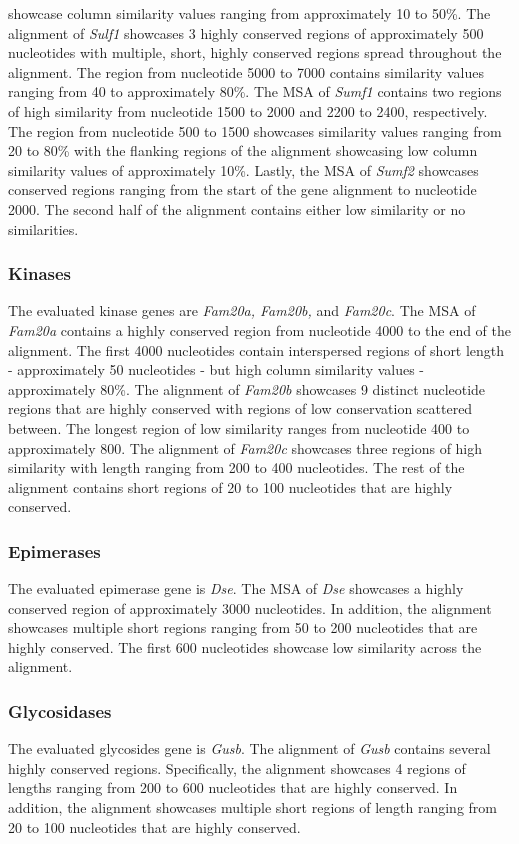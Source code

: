 \documentclass{article}
\begin{document}
showcase column similarity values ranging from approximately 10 to 50\%. The alignment of \textit{Sulf1} showcases 3 highly conserved regions of approximately 500 nucleotides with multiple, short, highly conserved regions spread throughout the alignment. The region from nucleotide 5000 to 7000 contains similarity values ranging from 40 to approximately 80\%. The MSA of \textit{Sumf1} contains two regions of high similarity from nucleotide 1500 to 2000 and 2200 to 2400, respectively. The region from nucleotide 500 to 1500 showcases similarity values ranging from 20 to 80\% with the flanking regions of the alignment showcasing low column similarity values of approximately 10\%. Lastly, the MSA of \textit{Sumf2} showcases conserved regions ranging from the start of the gene alignment to nucleotide 2000. The second half of the alignment contains either low similarity or no similarities. 

\subsubsection{Kinases}
The evaluated kinase genes are \textit{Fam20a, Fam20b,} and \textit{Fam20c}. The MSA of \textit{Fam20a} contains a highly conserved region from nucleotide 4000 to the end of the alignment. The first 4000 nucleotides contain interspersed regions of short length - approximately 50 nucleotides - but high column similarity values - approximately 80\%. The alignment of \textit{Fam20b} showcases 9 distinct nucleotide regions that are highly conserved with regions of low conservation scattered between. The longest region of low similarity ranges from nucleotide 400 to approximately 800. The alignment of \textit{Fam20c} showcases three regions of high similarity with length ranging from 200 to 400 nucleotides. The rest of the alignment contains short regions of 20 to 100 nucleotides that are highly conserved.

\subsubsection{Epimerases}
The evaluated epimerase gene is \textit{Dse}. The MSA of \textit{Dse} showcases a highly conserved region of approximately 3000 nucleotides. In addition, the alignment showcases multiple short regions ranging from 50 to 200 nucleotides that are highly conserved. The first 600 nucleotides showcase low similarity across the alignment. 

\subsubsection{Glycosidases}
The evaluated glycosides gene is \textit{Gusb}. The alignment of \textit{Gusb} contains several highly conserved regions. Specifically, the alignment showcases 4 regions of lengths ranging from 200 to 600 nucleotides that are highly conserved. In addition, the alignment showcases multiple short regions of length ranging from 20 to 100 nucleotides that are highly conserved.
\end{document}
